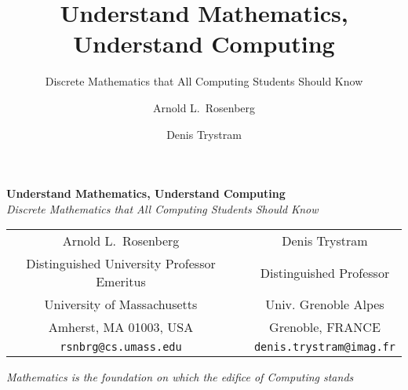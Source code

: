 \documentclass[envcountchap]{svmono}
\begin{document}



\author{Arnold L.~Rosenberg \and Denis Trystram}
\title{Understand Mathematics, Understand Computing}
\subtitle{Discrete Mathematics that All Computing Students Should Know}

\maketitle

\begin{center}
{\Large\bf Understand Mathematics, Understand Computing} \\
{\large\it Discrete Mathematics that All Computing Students Should Know}
\end{center}


\begin{center}
\begin{tabular}{ccc}
{\large Arnold L.~Rosenberg} & & {\large Denis Trystram} \\
Distinguished University Professor Emeritus
  & & Distinguished Professor \\
University of Massachusetts  & & Univ. Grenoble Alpes \\
Amherst, MA 01003, USA       & & Grenoble, FRANCE \\
{\small\tt rsnbrg@cs.umass.edu} & & {\small\tt denis.trystram@imag.fr}
\end{tabular}
\end{center}

\vspace*{.25in}

{\it Mathematics is the foundation on which the edifice of Computing
  stands}

\begin{figure}[h]
\centerline{}
\end{figure}




\frontmatter

%

%

\tableofcontents

\end{document}
